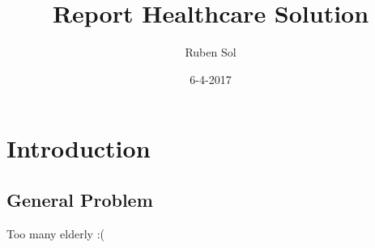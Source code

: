 \documentclass{article}
\title{Report Healthcare Solution}
\date{6-4-2017}
\author{Ruben Sol}
\begin{document}
	\maketitle
	\newpage

	\section{Introduction}
	\subsection{General Problem}
	Too many elderly :(
\end{document}
